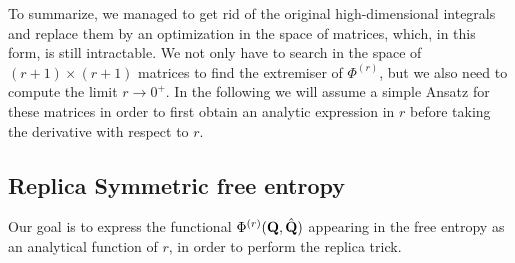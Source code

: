 			To summarize, we managed to get rid of the original high-dimensional integrals and replace them by an optimization in the space of matrices, which, in this form, is still intractable. We not only have to search in the space of $(r+1)\times (r+1)$ matrices to find the extremiser of $\Phi^{(r)}$, but we also need to compute the limit $r\to 0^{+}$.
			In the following we will assume a simple Ansatz for these matrices in order to first obtain an analytic expression in $r$ before taking the derivative with respect to $r$.

		\subsection{Replica Symmetric free entropy}
		\label{rs_free_entropy}			
			Our goal is to express the functional $\Phi^{(r)}({\mathbf{Q}},\hat{{\mathbf{Q}}})$ appearing in the free entropy as an analytical function of $r$, in order to perform the replica trick. 
			
